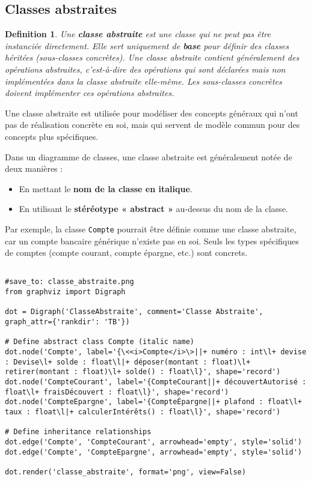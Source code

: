 \documentclass{article}
\newtheorem{definition}{Definition}
\begin{document}
\subsection{Classes abstraites}
\begin{definition}
Une \textbf{classe abstraite} est une classe qui ne peut pas être instanciée directement. Elle sert uniquement de \textbf{base} pour définir des classes héritées (sous-classes concrètes).  Une classe abstraite contient généralement des opérations abstraites, c'est-à-dire des opérations qui sont déclarées mais non implémentées dans la classe abstraite elle-même.  Les sous-classes concrètes doivent implémenter ces opérations abstraites.
\end{definition}

Une classe abstraite est utilisée pour modéliser des concepts généraux qui n'ont pas de réalisation concrète en soi, mais qui servent de modèle commun pour des concepts plus spécifiques.

Dans un diagramme de classes, une classe abstraite est généralement notée de deux manières :
\begin{itemize}
    \item En mettant le \textbf{nom de la classe en italique}.
    \item En utilisant le \textbf{stéréotype « abstract »} au-dessus du nom de la classe.
\end{itemize}

Par exemple, la classe \texttt{Compte} pourrait être définie comme une classe abstraite, car un compte bancaire générique n'existe pas en soi. Seuls les types spécifiques de comptes (compte courant, compte épargne, etc.) sont concrets.

\begin{verbatim}

#save_to: classe_abstraite.png
from graphviz import Digraph

dot = Digraph('ClasseAbstraite', comment='Classe Abstraite', graph_attr={'rankdir': 'TB'})

# Define abstract class Compte (italic name)
dot.node('Compte', label='{\<<i>Compte</i>\>||+ numéro : int\l+ devise : Devise\l+ solde : float\l|+ déposer(montant : float)\l+ retirer(montant : float)\l+ solde() : float\l}', shape='record')
dot.node('CompteCourant', label='{CompteCourant||+ découvertAutorisé : float\l+ fraisDécouvert : float\l}', shape='record')
dot.node('CompteEpargne', label='{CompteÉpargne||+ plafond : float\l+ taux : float\l|+ calculerIntérêts() : float\l}', shape='record')

# Define inheritance relationships
dot.edge('Compte', 'CompteCourant', arrowhead='empty', style='solid')
dot.edge('Compte', 'CompteEpargne', arrowhead='empty', style='solid')

dot.render('classe_abstraite', format='png', view=False)
\end{verbatim}
\end{document}
